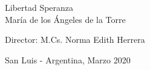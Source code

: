 \begin{center}
{\Large Libertad Speranza}\\
{\Large Mar\'ia de los  \'Angeles de la Torre}\\

\vspace{2cm}



{\Large Director: M.Cs. Norma Edith Herrera}\\

\vspace{3cm}


{\Large  San Luis - Argentina, Marzo 2020}\\



\end{center}
